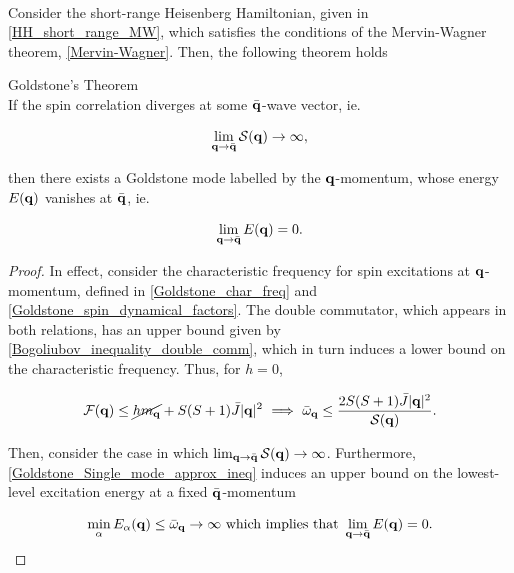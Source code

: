\documentclass{homework}
\begin{document}
\blanky \\

Consider the short-range Heisenberg Hamiltonian, given in \cref{HH_short_range_MW}, which satisfies the conditions of the Mervin-Wagner theorem, \cref{Mervin-Wagner}. Then, the following theorem holds

\begin{theorem}\label{Goldstone_theo} Goldstone's Theorem \\

If the spin correlation diverges at some ${\bar{\bf q}}$-wave vector, ie.

$$
    \lim_{{\bf q} \rightarrow \bar{\bf q}} \mathcal{S}({\bf q}) \rightarrow \infty,
$$

then there exists a \textnormal{Goldstone mode} labelled by the ${\bf q}$-momentum, whose energy $E({\bf q})$ vanishes at ${\bar {\bf q}}$, ie.

$$
    \lim_{{\bf q} \rightarrow \bar{\bf q}} E({\bf q}) = 0.
$$

\end{theorem}

\begin{proof}

In effect, consider the characteristic frequency for spin excitations at ${\bf q}$-momentum, defined in \cref{Goldstone_char_freq} and \cref{Goldstone_spin_dynamical_factors}. The double commutator, which appears in both relations, has an upper bound given by \cref{Bogoliubov_inequality_double_comm}, which in turn induces a lower bound on the characteristic frequency. Thus, for $h=0$, 

\begin{equation}
    \mathcal{F}({\bf q}) \leq \cancel{h m_{{\bf q}}} + S(S+1) \bar{J} |{\bf q}|^2 \textnormal{ } \Longrightarrow \textnormal{ } \bar{\omega}_{{\bf q}} \leq \frac{2S(S+1) \bar{J} |{\bf q}|^2}{\mathcal{S}({\bf q})}.
\end{equation}

Then, consider the case in which $\lim_{{\bf q} \rightarrow \bar{\bf q}} \mathcal{S}({\bf q}) \rightarrow \infty$. Furthermore, \cref{Goldstone_Single_mode_approx_ineq} induces an upper bound on the lowest-level excitation energy at a fixed $\bar{\bf q}$-momentum  

$$    
\min_{\alpha} E_{\alpha}({\bf q}) \leq \bar{\omega}_{{\bf q}} \rightarrow \infty \textnormal{ which implies that } \lim_{{\bf q} \rightarrow \bar{\bf q}} E({\bf q}) = 0.
$$
\end{proof}
\end{document}
